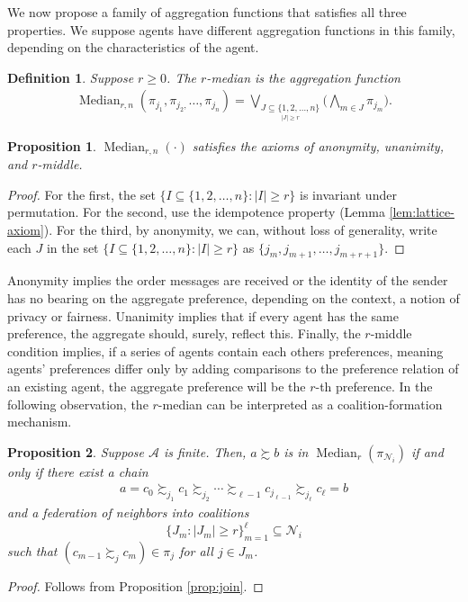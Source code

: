 \documentclass[conference]{ieeeconf}
\newcommand{\N}{\mathcal{N}}
\newcommand{\A}{\mathcal{A}}
\newcommand{\prefers}{\succsim}
\newcommand{\bigjoin}{\bigvee}
\newcommand{\bigmeet}{\bigwedge}
\renewcommand{\geq}{\geqslant}
\DeclareMathOperator{\Median}{Median}
\newtheorem{proposition}{Proposition}
\newtheorem{definition}{Definition}
\begin{document}
We now propose a family of aggregation functions that satisfies all three properties. We suppose agents have different aggregation functions in this family, depending on the characteristics of the agent.

\begin{definition}
    Suppose $r \geq 0$. The $r$-\emph{median} is the aggregation function
\begin{align}
    \Median_{r,n}\left( \pi_{j_1},\pi_{j_2,}\dots,\pi_{j_n}\right) =
    \bigjoin_{\underset{|J| \geq r }{J \subseteq \{1,2,\dots,n\}}} \biggl( \bigmeet_{m \in J} \pi_{j_m} \biggr).  \nonumber
\end{align}
\end{definition}

\begin{proposition} \label{prop:median}
    $\Median_{r,n}(\cdot)$ satisfies the axioms of anonymity, unanimity, and $r$-middle.
\end{proposition}
\begin{proof}
    For the first, the set $\{I \subseteq \{1,2,\dots,n\}: |I| \geq r\}$ is invariant under permutation. For the second, use the idempotence property (Lemma \ref{lem:lattice-axiom}).  For the third, by anonymity, we can, without loss of generality, write each $J$ in the set $\{I \subseteq \{1,2,\dots,n\}: |I| \geq r\}$ as $\{j_m,j_{m+1},\dots,j_{m+r+1}\}$.
\end{proof}

Anonymity implies the order messages are received or the identity of the sender has no bearing on the aggregate preference, depending on the context, a notion of privacy or fairness. Unanimity implies that if every agent has the same preference, the aggregate should, surely, reflect this. Finally, the $r$-middle condition implies, if a series of agents contain each others preferences, meaning agents' preferences differ only by adding comparisons to the preference relation of an existing agent, the aggregate preference will be the $r$-th preference. In the following observation, the $r$-median can be interpreted as a coalition-formation mechanism.

\begin{proposition} \label{prop:median-chain}
    Suppose $\A$ is finite. Then, $a \prefers b$ is in $\Median_r(\pi_{\N_i})$ if and only if there exist a chain
    \begin{align*}
        a = c_0 \prefers_{j_1} c_1 \prefers_{j_2} \cdots \prefers_{\ell-1} c_{j_{\ell-1}} \prefers_{j_\ell} c_{\ell} = b
    \end{align*}
    and a federation of neighbors into coalitions \[\{ J_m : |J_m| \geq r \}_{m=1}^{\ell} \subseteq \N_i\] such that $(c_{m-1} \prefers_{j} c_{m}) \in \pi_j$ for all  $j \in J_m$.
\end{proposition}
\begin{proof}
    Follows from Proposition \ref{prop:join}.
\end{proof}
\end{document}
